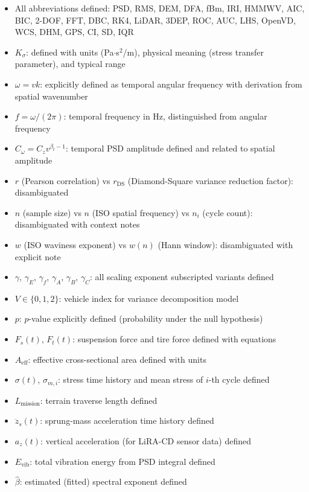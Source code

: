 \documentclass[11pt]{article}
\begin{document}
\begin{itemize}[leftmargin=*]
\item All abbreviations defined: PSD, RMS, DEM, DFA, fBm, IRI, HMMWV, AIC, BIC, 2-DOF, FFT, DBC, RK4, LiDAR, 3DEP, ROC, AUC, LHS, OpenVD, WCS, DHM, GPS, CI, SD, IQR
\item $K_\sigma$: defined with units (Pa$\cdot$s$^2$/m), physical meaning (stress transfer parameter), and typical range
\item $\omega = vk$: explicitly defined as temporal angular frequency with derivation from spatial wavenumber
\item $f = \omega/(2\pi)$: temporal frequency in Hz, distinguished from angular frequency
\item $C_\omega = C_z v^{\beta_t - 1}$: temporal PSD amplitude defined and related to spatial amplitude
\item $r$ (Pearson correlation) vs $r_{\text{DS}}$ (Diamond-Square variance reduction factor): disambiguated
\item $n$ (sample size) vs $n$ (ISO spatial frequency) vs $n_i$ (cycle count): disambiguated with context notes
\item $w$ (ISO waviness exponent) vs $w(n)$ (Hann window): disambiguated with explicit note
\item $\gamma$, $\gamma_E$, $\gamma_f$, $\gamma_A$, $\gamma_B$, $\gamma_C$: all scaling exponent subscripted variants defined
\item $V \in \{0,1,2\}$: vehicle index for variance decomposition model
\item $p$: $p$-value explicitly defined (probability under the null hypothesis)
\item $F_s(t)$, $F_t(t)$: suspension force and tire force defined with equations
\item $A_{\text{eff}}$: effective cross-sectional area defined with units
\item $\sigma(t)$, $\sigma_{m,i}$: stress time history and mean stress of $i$-th cycle defined
\item $L_{\text{mission}}$: terrain traverse length defined
\item $\ddot{z}_s(t)$: sprung-mass acceleration time history defined
\item $a_z(t)$: vertical acceleration (for LiRA-CD sensor data) defined
\item $E_{\mathrm{vib}}$: total vibration energy from PSD integral defined
\item $\hat{\beta}$: estimated (fitted) spectral exponent defined

\end{itemize}
\end{document}
